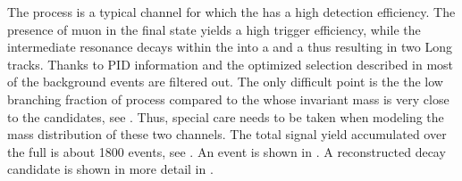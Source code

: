 The \BsJpsiKst process is a typical channel for which the \lhcb has a high detection efficiency.
The presence of muon in the final state yields a high trigger efficiency, while the intermediate
\Kstar resonance decays within the \velo into a \kaon and a \pion thus resulting in two Long tracks.
Thanks to PID information and the optimized selection described in  most of the background
events are filtered out. The only difficult point is the the low branching fraction of \BsJpsiKst process
compared to the \BdJpsiKst whose invariant mass is very close to the \BsJpsiKst candidates, see .
Thus, special care needs to be taken when modeling the mass distribution of these two channels.
The total \BsJpsiKst signal yield accumulated over the full \runone is about 1800 events, see .
An \lhcb event is shown in . A reconstructed \BsJpsiKst decay candidate is shown in
more detail in .

